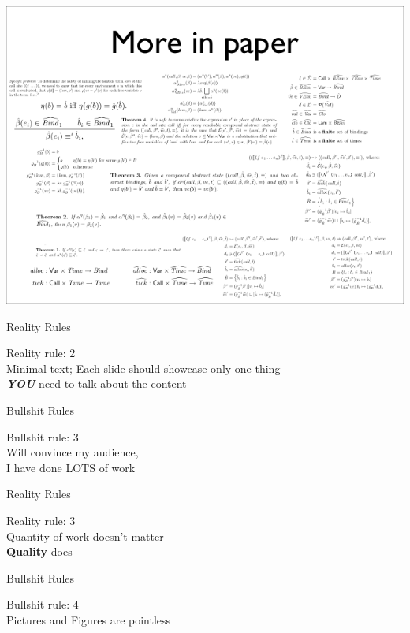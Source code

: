 \documentclass{beamer}
\newcommand{\BS}[1]{\Huge{Bullshit rule: #1}\\}
\newcommand{\RR}[1]{\color{white}\Huge{Reality rule: #1}\\}
\newcommand{\BBS}{Bullshit Rules}
\newcommand{\RRS}{\color{white}Reality Rules}
\begin{document}
\begin{frame}
	\includegraphics[width=\textwidth]{./garbage.png}
\end{frame}

\begin{frame}{\RRS}
	\begin{center}
		\RR{2}
		\Huge{Minimal text; Each slide should showcase only one thing}\\
		\Huge{\textbf{\emph{YOU}} need to talk about the content}
	\end{center}
\end{frame}

\begin{frame}{\BBS}
	\begin{center}
		\BS{3}
		\Huge{Will convince my audience,\\I have done LOTS of work}
	\end{center}
\end{frame}

\begin{frame}{\RRS}
	\begin{center}
		\RR{3}
		\Huge{Quantity of work doesn't matter}\\
		\Huge{\textbf{Quality} does}
	\end{center}
\end{frame}

\begin{frame}{\BBS}
	\begin{center}
		\BS{4}
		\Huge{Pictures and Figures are pointless}
	\end{center}
\end{frame}
\end{document}
